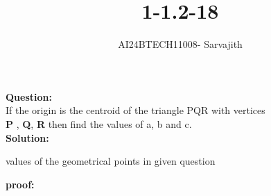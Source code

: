 \documentclass[journal]{IEEEtran}
\begin{document}

\vspace{3cm}

\title{1-1.2-18}
\author{AI24BTECH11008- Sarvajith
}
{\let\newpage\relax\maketitle}

\renewcommand{\thefigure}{\theenumi}
\renewcommand{\thetable}{\theenumi}
\setlength{\intextsep}{10pt} %
\renewcommand{\thetable}{\theenumi}
\textbf{Question: }\\
If the origin is the centroid of the triangle PQR with vertices\\
\textbf{P} , \textbf{Q}, \textbf{R} then find the values of a, b and
c.\\
\textbf{Solution: }\\
\renewcommand{\tablename}{TABLE 1}
\begin{table}[h!]    
  \centering
  
  \caption{values of the geometrical points in given question}
  \label{tab1-1.2-18-1}
\end{table}
\textbf{proof: }\\ 
\end{document}
